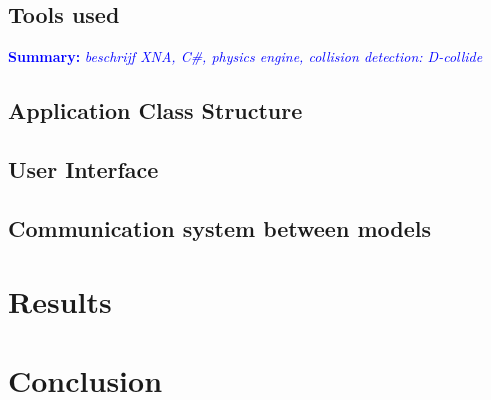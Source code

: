 \documentclass{article}
\newcommand{\inhoud}[1]{\textcolor{blue}{\textbf{Summary: }\it{#1}}}
\begin{document}
\subsection{Tools used}
\inhoud{beschrijf XNA, C\#, physics engine, collision detection: D-collide}
\subsection{Application Class Structure}
\subsection{User Interface}
\subsection{Communication system between models}

\section{Results}

\section{Conclusion}






\end{document}
